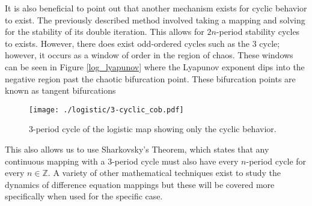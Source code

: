It is also beneficial to point out that another mechanism exists for cyclic behavior to exist. The previously described method involved taking a mapping and solving for the stability of its double iteration. This allows for $2n$-period stability cycles to exists. However, there does exist odd-ordered cycles such as the $3$ cycle; however, it occurs as a window of order in the region of chaos. These windows can be seen in Figure \ref{log_lyapunov} where the Lyapunov exponent dips into the negative region past the chaotic bifurcation point. These bifurcation points are known as tangent bifurcations
\begin{figure}
    \centering
    \texttt{[image: ./logistic/3-cyclic\_cob.pdf]}
    \caption{3-period cycle of the logistic map showing only the cyclic behavior.}
    \label{log_3-cyclic_cob}
\end{figure}
This also allows us to use Sharkovsky's Theorem, which states that any continuous mapping with a 3-period cycle must also have every $n$-period cycle for every $n\in\mathbb{Z}$.\autocite{Puu2003} A variety of other mathematical techniques exist to study the dynamics of difference equation mappings but these will be covered more specifically when used for the specific case. 



